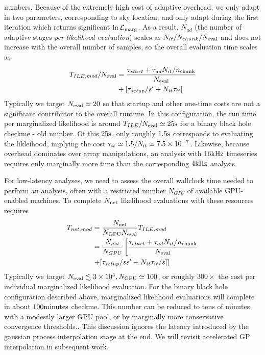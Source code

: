 \documentclass[twocolumn,prd,nofootinbib]{revtex4}
\newcommand\unit[1]{{\rm #1}}
\newcommand\editremark[1]{{\color{red} #1}}
\begin{document}
\editremark{numbers}.  
Because of the extremely high cost of adaptive overhead, we only adapt in two parameters, corresponding to sky location; 
and only adapt during the first iteration which returns significant $\ln {\cal L}_{\rm marg}$.  As a result, $N_{ad}$
(the number of adaptive stages \emph{per likelihood evaluation}) scales as $N_{it}/N_{chunk}/N_{\rm eval}$ and does not
increase with the overall number of samples, so the overall evaluation time scales as
\begin{align}
T_{ILE,mod}/N_{\rm eval} &= \frac{\tau_{start} + \tau_{ad}N_{it}/n_{\rm chunk}}{N_{\rm eval}} 
 \nonumber \\ &
 + 
 [ \tau_{setup}/s'  + N_{it}\tau_{it}
 ] 
\end{align}
Typically we target $N_{\rm eval} \simeq 20$ so that startup and other one-time costs  are not a significant contributor to the overall
runtime.   In this configuration, the run time per marginalized likelihood is around $T_{ILE}/N_{\rm eval} \simeq 25
\unit{s}$ for a binary black hole \editremark{checkme - old number}.    Of this $25 \unit{s}$, only roughly
$1.5\unit{s}$ corresponds to evaluating the likleihood, implying the cost $\tau_{it} \simeq 1.5/N_{\rm it} \simeq
7.5\times 10^{-7}$.
Likewise, because overhead dominates over array manipulations, an analysis with  $16\unit{kHz}$ timeseries requires only
marginally more time than the corresponding $4\unit{kHz}$ analysis.


For low-latency analyses, we need to assess the overall wallclock time needed to perform an analysis, often with a
restricted number $N_{GPU}$ of available GPU-enabled machines.   To  complete $N_{\rm net}$ likelihood evaluations
with these resources requires
\begin{align}
T_{net,mod} &= \frac{N_{\rm net}}{N_{\rm GPU} N_{\rm eval}} T_{ILE,mod} \nonumber \\
& =
  \frac{N_{net}}{N_{GPU}}\left[
\frac{\tau_{start} + \tau_{ad}N_{it}/n_{\rm chunk}}{N_{\rm eval}} 
 \right. \nonumber \\
& \left. + 
 [ \tau_{setup}/ss'  + N_{it}\tau_{it}/s
 ] 
 \right]
\end{align}
Typically we target $N_{\rm eval}  \lesssim 3\times 10^4, N_{\rm GPU} \simeq 100$, or roughly $300\times$ the cost per
individual marginalized likelihood evaluation.  For the binary black hole configuration described above, marginalized
likelihood evaluations will complete in about $100 \unit{minutes}$ \editremark{checkme}. This number can be reduced to
tens of minutes with a modestly larger GPU pool, or by marginally more conservative convergence thresholds..
This discussion ignores the latency introduced by the  gaussian process interpolation stage at the end.  We will revisit
accelerated GP interpolation in subsequent work.
\end{document}
